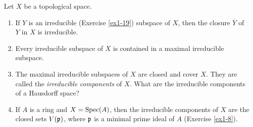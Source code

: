 \documentclass{article}
\begin{document}
\begin{exercise}
    Let \(X\) be a topological space.
    \begin{enumerate}
        \item
            If \(Y\) is an irreducible (Exercise \ref{ex1-19}) subspace of \(X\), then the closure \(\overline{Y}\) of \(Y\) in \(X\) is irreducible.
        \item
            Every irreducible subspace of \(X\) is contained in a maximal irreducible subspace.
        \item
            The maximal irreducible subspaces of \(X\) are closed and cover \(X\).
            They are called the \textit{irreducible components} of \(X\).
            What are the irreducible components of a Hausdorff space?
        \item
            If \(A\) is a ring and \(X = \operatorname{Spec}(A)\), then the irreducible components of \(X\) are the closed sets \(V(\mathfrak{p})\), where \(\mathfrak{p}\) is a minimal prime ideal of \(A\) (Exercise \ref{ex1-8}).
    \end{enumerate}
\end{exercise}
\end{document}
